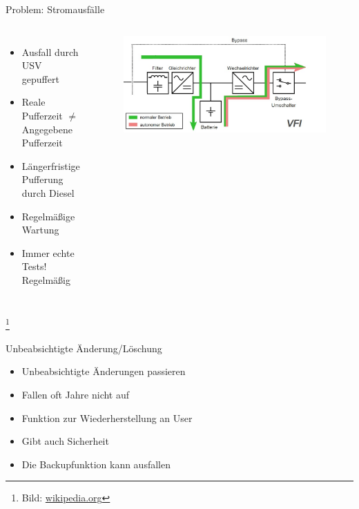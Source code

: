 \documentclass[10pt]{beamer}
\newcommand\blfootnote[1]{%
	\begingroup
	\renewcommand\thefootnote{}\footnote{#1}%
	\addtocounter{footnote}{-1}%
	\endgroup
}
\begin{document}
%
%
\begin{frame}[fragile]{Problem: Stromausfälle}

\begin{columns}[T,c,onlytextwidth]
	\begin{itemize}
		\item Ausfall durch USV gepuffert
		\item Reale Pufferzeit $\neq$ Angegebene Pufferzeit
		\item Längerfristige Pufferung durch Diesel
		\item Regelmäßige Wartung
		\item Immer echte Tests! Regelmäßig 
	\end{itemize}
	\begin{figure}
		\includegraphics[width=1\textwidth]{images/usv}
	\end{figure}
\end{columns}

\blfootnote{Bild: \href{https://de.wikipedia.org/wiki/Unterbrechungsfreie_Stromversorgung}{wikipedia.org}}
\end{frame}

%
%
\begin{frame}[fragile]{Unbeabsichtigte Änderung/Löschung}
	\begin{itemize}
	\item Unbeabsichtigte Änderungen passieren
	\item Fallen oft Jahre nicht auf
	\item Funktion zur Wiederherstellung an User
	\item Gibt auch Sicherheit
	\item Die Backupfunktion kann ausfallen 
\end{itemize}
\end{frame}
\end{document}
